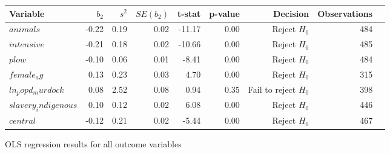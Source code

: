 \centering
\begin{tabular}{lrrrrrrrl}
\hline
Variable & $b_2$ & $s^2$ & $SE(b_2)$ & t-stat & p-value & Decision & Observations \\
\hline
$animals$ & -0.22 & 0.19 & 0.02 & -11.17 & 0.00 & Reject $H_0$ & 484\\
$intensive$ & -0.21 & 0.18 & 0.02 & -10.66 & 0.00 & Reject $H_0$ & 485\\
$plow$ & -0.10 & 0.06 & 0.01 & -8.41 & 0.00 & Reject $H_0$ & 484\\
$female_ag$ & 0.13 & 0.23 & 0.03 & 4.70 & 0.00 & Reject $H_0$ & 315\\
$ln_popd_murdock$ & 0.08 & 2.52 & 0.08 & 0.94 & 0.35 & Fail to reject $H_0$ & 398\\
$slavery_indigenous$ & 0.10 & 0.12 & 0.02 & 6.08 & 0.00 & Reject $H_0$ & 446\\
$central$ & -0.12 & 0.21 & 0.02 & -5.44 & 0.00 & Reject $H_0$ & 467\\
\hline
\end{tabular}
\caption{OLS regression results for all outcome variables}
\label{tab:regression_results}
